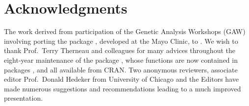 \documentclass[article]{jss}
\begin{document}
\section*{Acknowledgments}

The work derived from participation of the Genetic Analysis Workshops
(GAW) involving porting the  package
, developed at the Mayo Clinic, to  
\citep{zhao05}. We wish to thank Prof.~Terry Therneau and colleagues for 
many advices throughout the eight-year maintenance of the  package , 
whose functions are now contained in packages  
\citep{bdsmatrix},  and  all available from 
CRAN. Two anonymous reviewers, associate editor Prof.~Donald Hedeker 
from University of Chicago and the Editors have made numerous suggestions and recommendations 
leading to a much improved presentation.

\newpage

\end{document}
